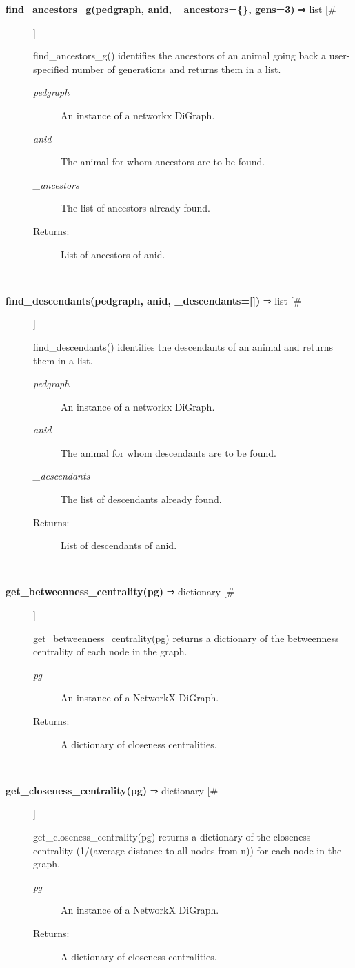 \begin{description}
\item[\textbf{find\_ancestors\_g(pedgraph, anid, \_ancestors=\{\}, gens=3)} ⇒ list [\#]
]
\par find\_ancestors\_g() identifies the ancestors of an animal going back a user-specified number of generations and returns them in a list.
\begin{description}
\item[\textit{pedgraph}
]
An instance of a networkx DiGraph.
\item[\textit{anid}
]
The animal for whom ancestors are to be found.
\item[\textit{\_ancestors}
]
The list of ancestors already found.
\item[Returns:
]
List of ancestors of anid.
\end{description}\\

\item[\textbf{find\_descendants(pedgraph, anid, \_descendants=[])} ⇒ list [\#]
]
\par find\_descendants() identifies the descendants of an animal and returns them in a list.
\begin{description}
\item[\textit{pedgraph}
]
An instance of a networkx DiGraph.
\item[\textit{anid}
]
The animal for whom descendants are to be found.
\item[\textit{\_descendants}
]
The list of descendants already found.
\item[Returns:
]
List of descendants of anid.
\end{description}\\

\item[\textbf{get\_betweenness\_centrality(pg)} ⇒ dictionary [\#]
]
\par get\_betweenness\_centrality(pg) returns a dictionary of the
betweenness centrality of each node in the graph.
\begin{description}
\item[\textit{pg}
]
An instance of a NetworkX DiGraph.
\item[Returns:
]
A dictionary of closeness centralities.
\end{description}\\

\item[\textbf{get\_closeness\_centrality(pg)} ⇒ dictionary [\#]
]
\par get\_closeness\_centrality(pg) returns a dictionary of the closeness
centrality (1/(average distance to all nodes from n)) for each
node in the graph.
\begin{description}
\item[\textit{pg}
]
An instance of a NetworkX DiGraph.
\item[Returns:
]
A dictionary of closeness centralities.
\end{description}\\


\end{description}
